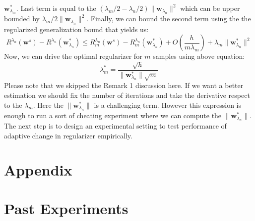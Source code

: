 \documentclass[11pt, a4paper, reqno, twoside]{scrartcl}
\theoremstyle{style}
\newcommand{\wv}{\bm{w}}
\newcommand{\0}{\mathbf{0}} %
\begin{document}
$\wv^*_{\lambda_m}$. Last term is equal to the $(\lambda_m/2-\lambda_n/2) \|
\wv_{\lambda_n}\|^2$ which can be upper bounded by $\lambda_m/2 \|
\wv_{\lambda_n}\|^2$. Finally, we can bound the second term using the the
regularized generalization bound that yields us: 
\begin{equation*}
	R^{\lambda_n}(\wv^s) - R^{\lambda_n}(\wv^*_{\lambda_n}) \leq 
	R^{\lambda_n}_m(\wv^s) - R^{\lambda_n}_m(\wv^*_{\lambda_n}) + O(\frac{h}{m
	\lambda_m}) + \lambda_m \|\wv_{\lambda_n}^*\|^2
\end{equation*}
Now, we can drive the optimal regularizer for $m$ samples using above equation:
\begin{equation*}
	\lambda_m^* = \frac{\sqrt{h}}{\|\wv_{\lambda_n}^*\|\sqrt{m}}
\end{equation*} 
Please note that we skipped the Remark 1 discussion here. If we want a
better estimation we should fix the number of iterations and take the derivative
respect to the $\lambda_m$. Here the $\|\wv_{\lambda_n}^*\|$ is a challenging
term. However this expression is enough to run a sort of cheating experiment
where we can compute the $\|\wv_{\lambda_n}^*\|$. The next step is to design an
experimental setting to test performance of adaptive change in regularizer
empirically.

\section{Appendix}
\section*{Past Experiments}
\end{document}
